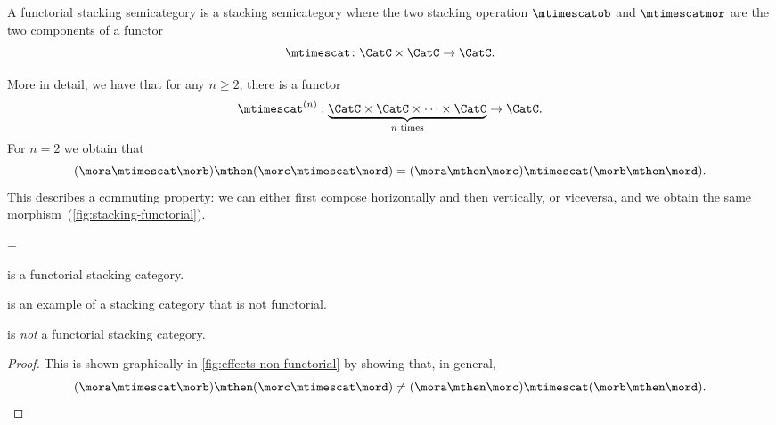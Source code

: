 \begin{ctdefinition}
    \label{def:functorial-stacking-semi-cat}
    A functorial stacking semicategory is a stacking semicategory where the two stacking operation $\mtimescatob$ and $\mtimescatmor$ are the two components of a functor
    \begin{equation}
        \mtimescat\colon \CatC \times \CatC \to \CatC.
    \end{equation}
\end{ctdefinition}

More in detail, we have that for any $n \geq 2$, there is a functor
%
\begin{equation}
    \mtimescat^{(n)}: \underbrace {\CatC \times \CatC \times \cdots \times \CatC}_{\text{$n$ times}} \to \CatC.
\end{equation}
%
For $n=2$ we obtain that
%
\begin{equation}
    (\mora \mtimescat \morb )
    \mthen (\morc \mtimescat \mord )
    =
    (\mora \mthen \morc ) \mtimescat (\morb \mthen \mord ).
\end{equation}
%
This describes a commuting property: we can either first compose horizontally and then vertically, or viceversa, and we obtain the same morphism~(\cref{fig:stacking-functorial}).

\begin{figure*}[h]
    \centering
    =
    \caption{Commutation of stacking and composition in a functorial stacking semicategory. }
    \label{fig:stacking-functorial}
\end{figure*}

\begin{lemma}
    \SetL is a functorial stacking category.
\end{lemma}

\Effects is an example of a stacking category that is not functorial.

\begin{lemma}
    \Effects is \emph{not} a functorial stacking category.
\end{lemma}

\begin{proof}
    This is shown graphically in \cref{fig:effects-non-functorial} by showing that, in general,
    \begin{equation}
        (\mora \mtimescat \morb )
        \mthen (\morc \mtimescat \mord )
        \neq
        (\mora \mthen \morc ) \mtimescat (\morb \mthen \mord ).
    \end{equation}
\end{proof}


